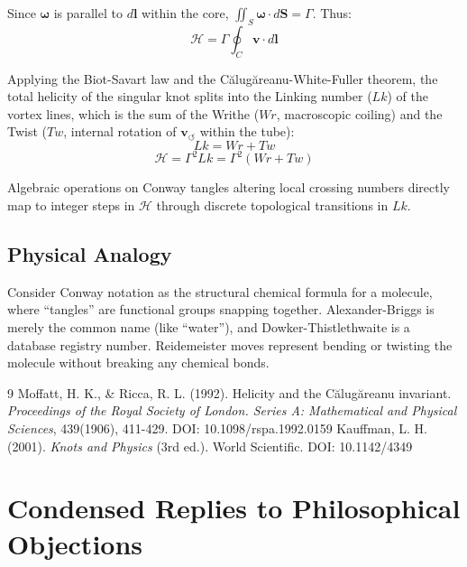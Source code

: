 \documentclass[10pt]{article}
\begin{document}
        Since $\boldsymbol{\omega}$ is parallel to $d\mathbf{l}$ within the core, $\iint_S \boldsymbol{\omega} \cdot d\mathbf{S} = \Gamma$. Thus:
        \begin{equation}
            \mathcal{H} = \Gamma \oint_{C} \mathbf{v} \cdot d\mathbf{l}
        \end{equation}

        Applying the Biot-Savart law and the C\u{a}lug\u{a}reanu-White-Fuller theorem, the total helicity of the singular knot splits into the Linking number ($Lk$) of the vortex lines, which is the sum of the Writhe ($Wr$, macroscopic coiling) and the Twist ($Tw$, internal rotation of $\mathbf{v}_{\!\boldsymbol{\circlearrowleft}}$ within the tube):
        \begin{equation}
            Lk = Wr + Tw
        \end{equation}
        \begin{equation}
            \mathcal{H} = \Gamma^2 Lk = \Gamma^2 (Wr + Tw)
        \end{equation}

        Algebraic operations on Conway tangles altering local crossing numbers directly map to integer steps in $\mathcal{H}$ through discrete topological transitions in $Lk$.

    \subsection{Physical Analogy}
        Consider Conway notation as the structural chemical formula for a molecule, where ``tangles'' are functional groups snapping together. Alexander-Briggs is merely the common name (like ``water''), and Dowker-Thistlethwaite is a database registry number. Reidemeister moves represent bending or twisting the molecule without breaking any chemical bonds.

        \begin{thebibliography}{9}
             Moffatt, H. K., \& Ricca, R. L. (1992). Helicity and the C\u{a}lug\u{a}reanu invariant. \textit{Proceedings of the Royal Society of London. Series A: Mathematical and Physical Sciences}, 439(1906), 411-429. DOI: 10.1098/rspa.1992.0159
             Kauffman, L. H. (2001). \textit{Knots and Physics} (3rd ed.). World Scientific. DOI: 10.1142/4349
        \end{thebibliography}


\section{Condensed Replies to Philosophical Objections}
\label{sec:v075-philosophy}
\end{document}
